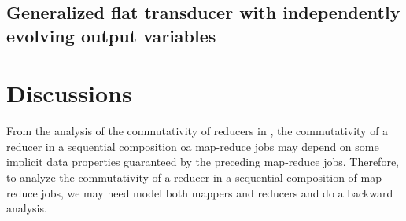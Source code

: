 \documentclass[runningheads,a4paper]{llncs}
\begin{document}
\subsection{Generalized flat transducer with independently evolving output variables}

\section{Discussions}

From the analysis of the commutativity of reducers in \cite{XZZ+14}, the commutativity of a reducer in a sequential composition oa map-reduce jobs may depend on some implicit data properties guaranteed by the preceding map-reduce jobs. Therefore, to analyze the commutativity of a reducer in a sequential composition of map-reduce jobs, we may need model both mappers and reducers and do a backward analysis.





\begin{appendix}



\end{appendix}
\end{document}
